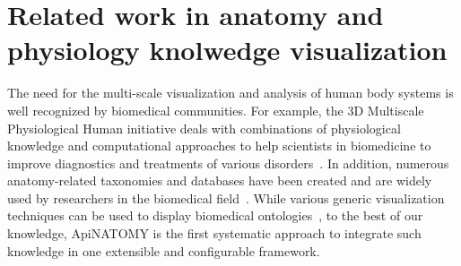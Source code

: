 \section{Related work in anatomy and physiology knolwedge visualization } \label{sect:relatedWork}                                          %

The need for the multi-scale visualization and analysis of human body systems is well recognized by biomedical communities. For example, the 3D Multiscale Physiological Human initiative deals with combinations of physiological knowledge and computational approaches to help scientists in biomedicine to improve diagnostics and treatments of various disorders~\cite{MRC09,Mag09}. In addition, numerous anatomy-related taxonomies and databases have been created and are widely used by researchers in the biomedical field~\cite{BDB08}. While various generic visualization techniques can be used to display biomedical ontologies~\cite{KHL+07}, to the best of our knowledge, ApiNATOMY is the first systematic approach to integrate such knowledge in one extensible and configurable framework.

